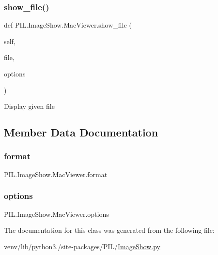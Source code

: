 \subsubsection{\texorpdfstring{show\+\_\+file()}{show\_file()}}
{\footnotesize\ttfamily def P\+I\+L.\+Image\+Show.\+Mac\+Viewer.\+show\+\_\+file (\begin{DoxyParamCaption}\item[{}]{self,  }\item[{}]{file,  }\item[{}]{options }\end{DoxyParamCaption})}

\begin{DoxyVerb}Display given file\end{DoxyVerb}
 

\subsection{Member Data Documentation}
\mbox{\label{classPIL_1_1ImageShow_1_1MacViewer_a6302eb1255d9e0db266fd3b5d121039c}} 
\subsubsection{\texorpdfstring{format}{format}}
{\footnotesize\ttfamily P\+I\+L.\+Image\+Show.\+Mac\+Viewer.\+format\hspace{0.3cm}{\ttfamily [static]}}

\mbox{\label{classPIL_1_1ImageShow_1_1MacViewer_ab5bc10ef38304f9a19b548923a76485c}} 
\subsubsection{\texorpdfstring{options}{options}}
{\footnotesize\ttfamily P\+I\+L.\+Image\+Show.\+Mac\+Viewer.\+options\hspace{0.3cm}{\ttfamily [static]}}



The documentation for this class was generated from the following file\+:\begin{DoxyCompactItemize}
\item 
venv/lib/python3./site-\/packages/\+P\+I\+L/\hyperlink{ImageShow_8py}{Image\+Show.\+py}\end{DoxyCompactItemize}
